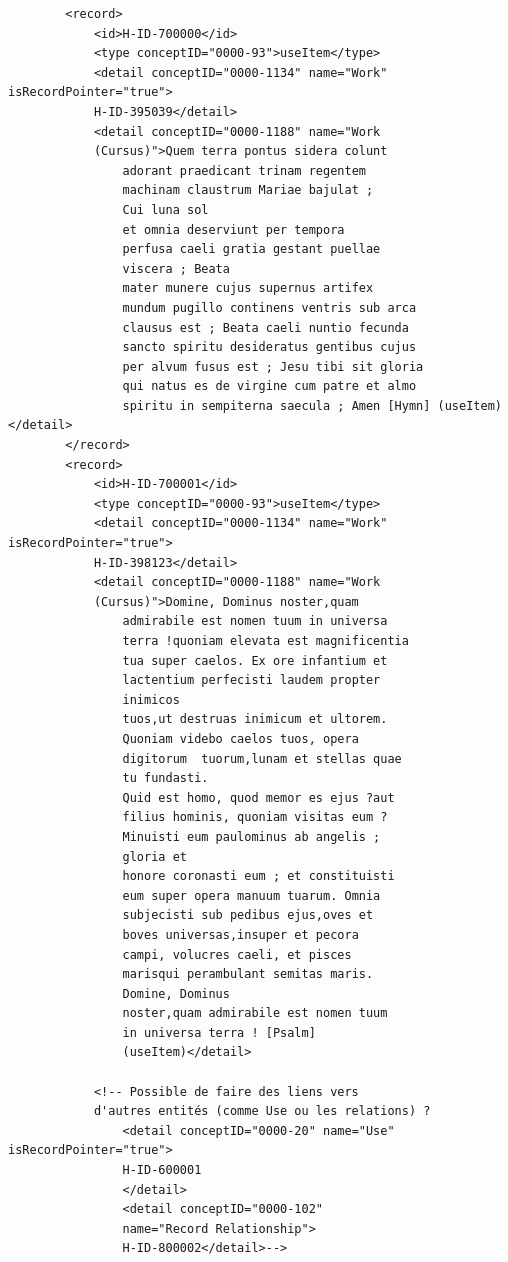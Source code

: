 \documentclass[a4paper,12pt,twoside]{book}
\begin{document}
\begin{verbatim}
        <record>
            <id>H-ID-700000</id>
            <type conceptID="0000-93">useItem</type>
            <detail conceptID="0000-1134" name="Work" isRecordPointer="true">
            H-ID-395039</detail>
            <detail conceptID="0000-1188" name="Work
            (Cursus)">Quem terra pontus sidera colunt
                adorant praedicant trinam regentem 
                machinam claustrum Mariae bajulat ; 
                Cui luna sol
                et omnia deserviunt per tempora 
                perfusa caeli gratia gestant puellae 
                viscera ; Beata
                mater munere cujus supernus artifex 
                mundum pugillo continens ventris sub arca
                clausus est ; Beata caeli nuntio fecunda 
                sancto spiritu desideratus gentibus cujus
                per alvum fusus est ; Jesu tibi sit gloria 
                qui natus es de virgine cum patre et almo
                spiritu in sempiterna saecula ; Amen [Hymn] (useItem)</detail>
        </record>
        <record>
            <id>H-ID-700001</id>
            <type conceptID="0000-93">useItem</type>
            <detail conceptID="0000-1134" name="Work" isRecordPointer="true">
            H-ID-398123</detail>
            <detail conceptID="0000-1188" name="Work 
            (Cursus)">Domine, Dominus noster,quam
                admirabile est nomen tuum in universa 
                terra !quoniam elevata est magnificentia 
                tua super caelos. Ex ore infantium et 
                lactentium perfecisti laudem propter 
                inimicos
                tuos,ut destruas inimicum et ultorem.
                Quoniam videbo caelos tuos, opera 
                digitorum  tuorum,lunam et stellas quae 
                tu fundasti.
                Quid est homo, quod memor es ejus ?aut
                filius hominis, quoniam visitas eum ? 
                Minuisti eum paulominus ab angelis ;
                gloria et
                honore coronasti eum ; et constituisti
                eum super opera manuum tuarum. Omnia
                subjecisti sub pedibus ejus,oves et 
                boves universas,insuper et pecora
                campi, volucres caeli, et pisces
                marisqui perambulant semitas maris. 
                Domine, Dominus
                noster,quam admirabile est nomen tuum 
                in universa terra ! [Psalm] 
                (useItem)</detail>

            <!-- Possible de faire des liens vers 
            d'autres entités (comme Use ou les relations) ? 
                <detail conceptID="0000-20" name="Use" isRecordPointer="true">
                H-ID-600001
                </detail>
                <detail conceptID="0000-102" 
                name="Record Relationship">
                H-ID-800002</detail>-->


\end{verbatim}
\end{document}
